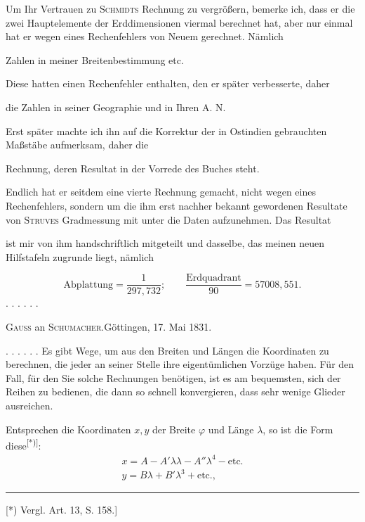 Um Ihr Vertrauen zu \textsc{Schmidts} Rechnung zu vergrößern, bemerke ich, dass er die zwei Hauptelemente der Erddimensionen viermal berechnet hat, aber nur einmal hat er wegen eines Rechenfehlers von Neuem gerechnet. Nämlich
\begin{list}{}{\setlength{\leftmargin}{2em}\setlength{\itemsep}{0pt}\setlength{\parsep}{0pt}}
\item[1)] Zahlen in meiner Breitenbestimmung etc.

Diese hatten einen Rechenfehler enthalten, den er später verbesserte, daher
\item[2)] die Zahlen in seiner Geographie und in Ihren A. N.

Erst später machte ich ihn auf die Korrektur der in Ostindien gebrauchten Maßstäbe aufmerksam, daher die
\item[3)] Rechnung, deren Resultat in der Vorrede des Buches steht.

Endlich hat er seitdem eine vierte Rechnung gemacht, nicht wegen eines Rechenfehlers, sondern um die ihm erst nachher bekannt gewordenen Resultate von \textsc{Struves} Gradmessung mit unter die Daten aufzunehmen. Das Resultat
\item[4)] ist mir von ihm handschriftlich mitgeteilt und dasselbe, das meinen neuen Hilfstafeln zugrunde liegt, nämlich
\end{list}
\[
\text{Abplattung}=\frac1{297{,}732};\qquad
\frac{\text{Erdquadrant}}{90}=57008{,}551.
\]
. . . . . .
\bigskip
\begin{center}\textsc{Gauss} an \textsc{Schumacher}.\quad Göttingen, 17. Mai 1831.\end{center}
. . . . . . Es gibt  Wege, um aus den Breiten und Längen die Koordinaten zu berechnen, die jeder an seiner Stelle ihre eigentümlichen Vorzüge haben. Für den Fall, für den Sie solche Rechnungen benötigen, ist es am bequemsten, sich der Reihen zu bedienen, die dann so schnell konvergieren, dass sehr wenige Glieder ausreichen.

Entsprechen die Koordinaten \(x,y\) der Breite \(\varphi\) und Länge \(\lambda\), so ist die Form diese\textsuperscript{[*)]}:
\[
\begin{array}{l}
x=A-A'\lambda\lambda-A''\lambda^4-\text{etc.}\\
y=B\lambda+B'\lambda^3+\text{etc.},
\end{array}
\]
\par\noindent\rule{4cm}{.4pt}\par
{\footnotesize\noindent\hspace*{\parindent}[*) Vergl. Art. 13, S. 158.]\par}

